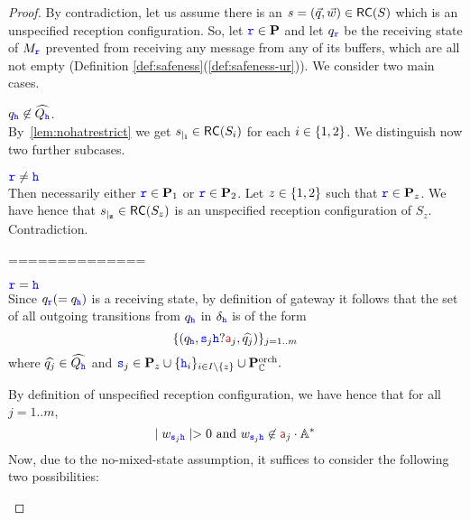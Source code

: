 \begin{proof}
By contradiction, let us assume there is an $s= (\vec{q},\vec{w})\in \mathsf{RC}(S)$ which is an unspecified reception configuration.
So, let ${\mathtt{\color{blue}{ {r}}}} \in \mathbf{P}$ and let ${q}_{\mathtt{\color{blue}{ {r}}}}$  be the receiving state of $M_{\mathtt{\color{blue}{ {r}}}}$ prevented from 
receiving any message from any of its buffers, which are all not empty (Definition \ref{def:safeness}(\ref{def:safeness-ur})).
We consider two main cases.
\begin{description}
%
\item 
${q}_{\mathtt{\color{blue}{ {h}}}}\not\in \widehat{Q_{\mathtt{\color{blue}{ {h}}}}}$.\\ 
By~\cref{lem:nohatrestrict} we get ${s}_{\mid_{\mathbf{i}}}\in \mathsf{RC}(S_i)$ for each $i\in\{1,2\}$.
We distinguish now two further subcases.
\begin{description}
\item 
${\mathtt{\color{blue}{ {r}}}} \neq { \ensuremath{\mathtt{\color{blue}{ {h}}}} }$\\
Then necessarily either ${\mathtt{\color{blue}{ {r}}}}\in\mathbf{P}_1$ or ${\mathtt{\color{blue}{ {r}}}}\in\mathbf{P}_2$.
Let $z\in\{1,2\}$ such that ${\mathtt{\color{blue}{ {r}}}}\in\mathbf{P}_z$. We have hence that ${s}_{\mid_{\mathbf{z}}}\in \mathsf{RC}(S_z)$ is an unspecified reception configuration of $S_z$. Contradiction.

==============

\item 
${\mathtt{\color{blue}{ {r}}}} = {\mathtt{\color{blue}{ {h}}}}$\\
Since ${q}_{\mathtt{\color{blue}{ {r}}}}(= {q}_{\mathtt{\color{blue}{ {h}}}})$ is a receiving state,
by definition of gateway it follows that
 the set
of all outgoing transitions from $q_{\mathtt{\color{blue}{ {h}}}}$ in $\delta_{\mathtt{\color{blue}{ {h}}}}$ is of the form 
$$\Set{({q}_\HH,\tts_j\HH?\msg[a]_j,\widehat{q_j})}_{j=1..m}$$
where $\widehat{q_j}\in  \widehat{Q_{\mathtt{\color{blue}{ {h}}}}}$ and 
 ${\mathtt{\color{blue}{ {s}}}}_j \in \mathbf{P}_z \cup \{{\mathtt{\color{blue}{ {h}}}}_i\}_{i \in I\setminus\{z\}}\cup\mathbf{P}_{\mathbb{C}}^{\mathrm{orch}}.$

By definition of unspecified reception configuration,  we have hence that for all $j=1..m$, 
\begin{equation} \label{eq:wur}
\mid w_{\tts_j\HH}\mid > 0 
\text{ and } w_{\tts_j\HH}\not\in  \msg[a]_j \cdot \mathbb{A}^*  %
\end{equation}
Now, due to the no-mixed-state assumption, it suffices to
consider the following two possibilities:\\


\end{description}
\end{description}
\end{proof}

